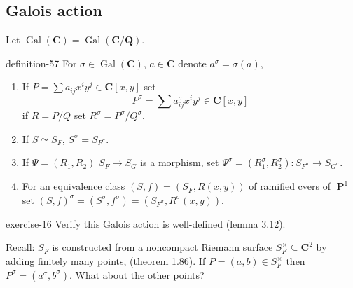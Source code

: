 \documentclass[10pt,]{book}
\numberwithin{equation}{section}
\newcommand{\lb}{[}
\newcommand{\rb}{]}
\newcommand{\QQ}{\mathbf{Q}}
\newcommand{\CC}{\mathbf{C}}
\newcommand{\Gal}[2]{\operatorname{Gal}(#1/#2)}
\DeclareMathOperator{\PP}{\mathbf{P}}
\begin{document}
\subsection[{Galois action}]{Galois action}\label{subsection-55}
\hypertarget{p-611}{}%
Let \(\operatorname{Gal}(\CC) = \Gal{\CC}{\QQ}\).%
\begin{definition}{}{definition-57}%
\hypertarget{p-612}{}%
For \(\sigma \in \operatorname{Gal}(\CC)\), \(a\in \CC\) denote \(a^\sigma = \sigma(a)\),\leavevmode%
\begin{enumerate}
\item\hypertarget{li-117}{}If \(P = \sum a_{ij} x^iy^j \in \CC\lb x,y\rb\) set%
\begin{equation*}
P^\sigma = \sum a^\sigma_{ij} x^iy^j \in \CC\lb x,y\rb
\end{equation*}
if \(R = P/Q\) set \(R^\sigma = P^\sigma / Q^\sigma\).%
\item\hypertarget{li-118}{}If \(S \simeq S_F\), \(S^\sigma = S_{F^\sigma}\).%
\item\hypertarget{li-119}{}If \(\Psi = (R_1, R_2)\) \(S_F\to S_G\) is a morphism, set \(\Psi^ \sigma = (R_1^\sigma , R_2 ^\sigma) \colon S_{F^\sigma} \to S_{G^\sigma}\).%
\item\hypertarget{li-120}{}For an equivalence class \((S,f) = (S_F, R(x,y))\) of \hyperref[def-dess-ramified]{ramified} cvers of \(\PP^1\) set \((S,f)^\sigma = (S^\sigma, f^\sigma) = (S_{F^\sigma}, R^\sigma (x,y))\).%
\end{enumerate}
%
\end{definition}
\begin{inlineexercise}{}{exercise-16}%
\hypertarget{p-613}{}%
Verify this Galois action is well-defined (lemma 3.12).%
\end{inlineexercise}
\hypertarget{p-614}{}%
Recall: \(S_F\) is    constructed from a noncompact \hyperref[def-top-riem-surface]{Riemann surface} \(S_F^\times \subseteq \CC^2\) by adding finitely many points, (theorem 1.86). If \(P=  (a,b) \in S_F^\times\) then \(P^\sigma = (a^\sigma, b^\sigma)\). What about the other points?%
%
%
\typeout{************************************************}
\typeout{************************************************}
%
\end{document}
